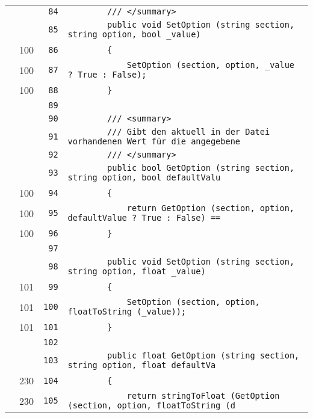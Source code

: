 \documentclass[a4paper,10pt]{article}
\begin{document}
\begin{longtable}[l]{lrrl}
\cellcolor{gray} &  & \verb~84~ & \verb~        /// </summary>~\\
\cellcolor{gray} &  & \verb~85~ & \verb~        public void SetOption (string section, string option, bool _value)~\\
\cellcolor{green} & 100 & \verb~86~ & \verb~        {~\\
\cellcolor{green} & 100 & \verb~87~ & \verb~            SetOption (section, option, _value ? True : False);~\\
\cellcolor{green} & 100 & \verb~88~ & \verb~        }~\\
\cellcolor{gray} &  & \verb~89~ & \verb~~\\
\cellcolor{gray} &  & \verb~90~ & \verb~        /// <summary>~\\
\cellcolor{gray} &  & \verb~91~ & \verb~        /// Gibt den aktuell in der Datei vorhandenen Wert für die angegebene ~\\
\cellcolor{gray} &  & \verb~92~ & \verb~        /// </summary>~\\
\cellcolor{gray} &  & \verb~93~ & \verb~        public bool GetOption (string section, string option, bool defaultValu~\\
\cellcolor{green} & 100 & \verb~94~ & \verb~        {~\\
\cellcolor{green} & 100 & \verb~95~ & \verb~            return GetOption (section, option, defaultValue ? True : False) ==~\\
\cellcolor{green} & 100 & \verb~96~ & \verb~        }~\\
\cellcolor{gray} &  & \verb~97~ & \verb~~\\
\cellcolor{gray} &  & \verb~98~ & \verb~        public void SetOption (string section, string option, float _value)~\\
\cellcolor{green} & 101 & \verb~99~ & \verb~        {~\\
\cellcolor{green} & 101 & \verb~100~ & \verb~            SetOption (section, option, floatToString (_value));~\\
\cellcolor{green} & 101 & \verb~101~ & \verb~        }~\\
\cellcolor{gray} &  & \verb~102~ & \verb~~\\
\cellcolor{gray} &  & \verb~103~ & \verb~        public float GetOption (string section, string option, float defaultVa~\\
\cellcolor{green} & 230 & \verb~104~ & \verb~        {~\\
\cellcolor{green} & 230 & \verb~105~ & \verb~            return stringToFloat (GetOption (section, option, floatToString (d~\\

\end{longtable}
\end{document}
